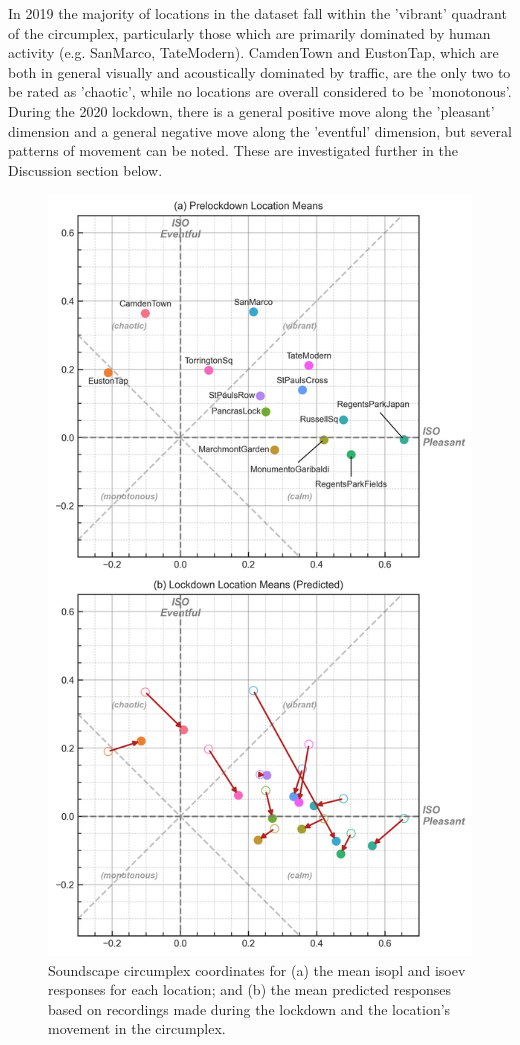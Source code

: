    In 2019 the majority of locations in the dataset fall within the 'vibrant' quadrant of the circumplex, particularly those which are primarily dominated by human activity (e.g. SanMarco, TateModern). CamdenTown and EustonTap, which are both in general visually and acoustically dominated by traffic, are the only two to be rated as 'chaotic', while no locations are overall considered to be 'monotonous'. During the 2020 lockdown, there is a general positive move along the 'pleasant' dimension and a general negative move along the 'eventful' dimension, but several patterns of movement can be noted. These are investigated further in the Discussion section below.

   \begin{figure}
     \caption{Soundscape circumplex coordinates for (a) the mean \gls{isopl} and \gls{isoev} responses for each location; and (b) the mean predicted responses based on recordings made during the lockdown and the location's movement in the circumplex. \label{fig:circumplex-locations}}
     \centering
     \includegraphics[width=.75\textwidth]{Figures/Lockdown Figure5.jpg}
   \end{figure}

